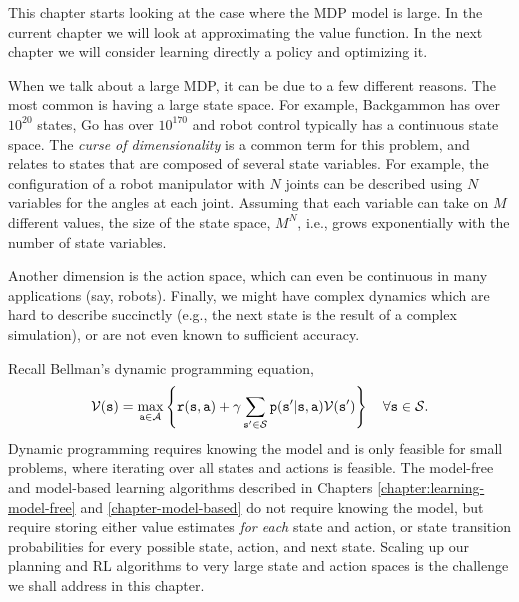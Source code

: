 \usetikzlibrary{calc}
\usetikzlibrary{shapes,arrows}
%
%
%

\newcommand{\ftrs}{\phi}
\newcommand{\FtrMtx}{\Phi}

This chapter starts looking at the case where the MDP model is
large. In the current chapter we will look at approximating the
value function. In the next chapter we will consider learning
directly a policy and optimizing it.

When we talk about a large MDP, it can be due to a few different
reasons. The most common is having a large state space. For example,
Backgammon has over $10^{20}$ states, Go has over $10^{170}$ and robot control typically 
has a continuous state space. The \textit{curse of dimensionality} is a common term for this problem, and relates to states that are composed of several state variables. For example, the configuration of a robot manipulator with $N$ joints can be described using $N$ variables for the angles at each joint. Assuming that each variable can take on $M$ different values, the size of the state space, $M^N$, i.e., grows exponentially with the number of state variables.

Another dimension is the action space,
which can even be continuous in many applications (say, robots).
Finally, we might have complex dynamics which are hard to describe
succinctly (e.g., the next state is the result of a complex simulation), or are not even known to sufficient accuracy. 

Recall Bellman's dynamic programming equation,
$$\mathcal{V}({\tt s}) = \max_{{\tt a} \in \mathcal{A}} \left\{{\tt r}({\tt s},{\tt a}) + \gamma \sum_{{\tt s}' \in \mathcal{S}} {\tt p}({\tt s}'|{\tt s},{\tt a})\mathcal{V}({\tt s}')\right\}\quad \forall {\tt s} \in \mathcal{S}.$$
Dynamic programming requires knowing the model and is only feasible for small problems, where iterating over all states and actions is feasible. The model-free and model-based learning algorithms described in Chapters \ref{chapter:learning-model-free} and \ref{chapter-model-based} do not require knowing the model, but require storing either value estimates \textit{for each} state and action, or state transition probabilities for every possible state, action, and next state. Scaling up our planning and RL algorithms to very large state and action spaces is the challenge we shall address in this chapter.


